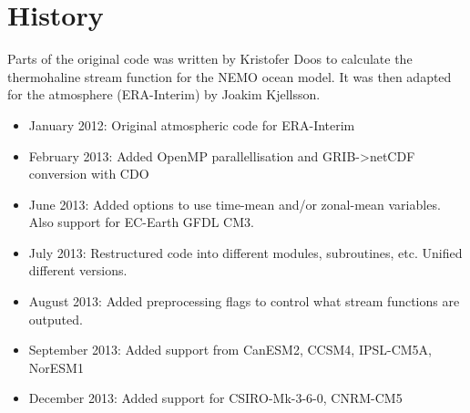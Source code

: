 \documentclass[a4paper]{article}
\begin{document}
\section{History%
  \label{history}%
}

Parts of the original code was written by Kristofer Doos to calculate the thermohaline stream function for the NEMO ocean model.
It was then adapted for the atmosphere (ERA-Interim) by Joakim Kjellsson.
%
\begin{itemize}

\item January 2012: Original atmospheric code for ERA-Interim

\item February 2013: Added OpenMP parallellisation and GRIB->netCDF conversion with CDO

\item June 2013: Added options to use time-mean and/or zonal-mean variables. Also support for EC-Earth GFDL CM3.

\item July 2013: Restructured code into different modules, subroutines, etc. Unified different versions.

\item August 2013: Added preprocessing flags to control what stream functions are outputed.

\item September 2013: Added support from CanESM2, CCSM4, IPSL-CM5A, NorESM1

\item December 2013: Added support for CSIRO-Mk-3-6-0, CNRM-CM5

\end{itemize}
\end{document}
